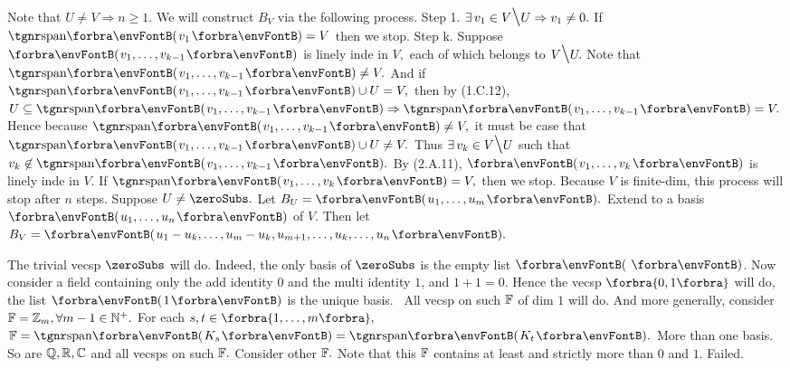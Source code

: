 \TextB{\vspace{0pt}}
Note that $U\neq V\Rightarrow n\geqslant 1.$ We will construct $B_V$ via the following process.\TextB{}
{\tgbfx Step 1.} $\exists\,v_1\in V\Backslash U\Rightarrow v_1\neq 0.$ If $\Span{v_1}=V$ then we stop.\TextB{}
{\tgbfx Step k.} Suppose $\Par{v_1,\dots,v_{k-1}}$ is linely inde in $V,$ each of which belongs to $V\Backslash U.$\TextB{}
 Note that $\Span{v_1,\dots,v_{k-1}}\neq V.$ And if $\Span{v_1,\dots,v_{k-1}}\cup U=V,$ then by (1.C.12),\TextB{}
  $U\subseteq \Span{v_1,\dots,v_{k-1}}\Rightarrow\Span{v_1,\dots,v_{k-1}}=V.$\TextB{}
 Hence because $\Span{v_1,\dots,v_{k-1}}\neq V,$ it must be case that $\Span{v_1,\dots,v_{k-1}}\cup U\neq V.$\TextB{}
 Thus $\exists\,v_k\in V\Backslash U$ such that $v_k\not\in\Span{v_1,\dots,v_{k-1}}.$\TextB{}
 By (2.A.11), $\Par{v_1,\dots,v_k}$ is linely inde in $V$. If $\Span{v_1,\dots,v_k}=V,$ then we stop.\TextB{}
Because $V$ is finite-dim, this process will stop after $n$ steps.\PfEnd\vspace{4pt}\TextB{}
\Or Suppose $U\neq\zeroSubs.$ Let $B_U=\Par{u_1,\dots,u_m}.$ Extend to a basis $\Par{u_1,\dots,u_n}$ of $V.$\TextB{}
\Blind{\Or}Then let $B_V=\Par{u_1-u_k,\dots,u_m-u_k,u_{m+1},\dots,u_k,\dots,u_n}.$\PfEnd
\SepLine

The trivial vecsp $\zeroSubs$ will do. Indeed, the only basis of $\zeroSubs$ is the empty list $\Par{\,}$.\parSol{}
Now consider a field containing only the add identity $0$ and the multi identity $1$,\parSol{}
and $1+1=0.$ Hence the vecsp $\Bra{0,1}$ will do, the list $\Par{1}$ is the unique basis.\parSol{}
\Comment \,\,\,All vecsp on such ${\mathbb{F}}$ of dim $1$ will do.\parSol{}
And more generally, consider ${\mathbb{F}}={\mathbb{Z}}_m,\forall m-1\in{\mathbb{N}^+}.$ For each $s,t\in\Bra{1,\dots,m},$\parSol{}
$\Fbb=\Span{K_s}=\Span{K_t}.$ More than one basis. So are ${\mathbb{Q}},{\mathbb{R}},{\mathbb{C}}$ and all vecsps on such ${\mathbb{F}}.$\parSol{}
Consider other ${\mathbb{F}}.$ Note that this ${\mathbb{F}}$ contains at least and strictly more than $0$ and $1.$ Failed.\PfEnd
\SepLine

